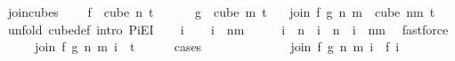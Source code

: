 \begin{isabellebody}
\isanewline
{}\isamarkupfalse%
\ join{\isacharunderscore}{\kern0pt}cubes{\isacharcolon}{\kern0pt}\ \isanewline
\ \ \ {\isachardoublequoteopen}f\ {\isasymin}\ cube\ n\ {\isacharparenleft}{\kern0pt}t{\isacharplus}{\kern0pt}{}{\isacharparenright}{\kern0pt}{\isachardoublequoteclose}\ \isanewline
\ \ \ \ \ {\isachardoublequoteopen}g\ {\isasymin}\ cube\ m\ {\isacharparenleft}{\kern0pt}t{\isacharplus}{\kern0pt}{}{\isacharparenright}{\kern0pt}{\isachardoublequoteclose}\isanewline
\ \ \ {\isachardoublequoteopen}join\ f\ g\ n\ m\ {\isasymin}\ cube\ {\isacharparenleft}{\kern0pt}n{\isacharplus}{\kern0pt}m{\isacharparenright}{\kern0pt}\ {\isacharparenleft}{\kern0pt}t{\isacharplus}{\kern0pt}{}{\isacharparenright}{\kern0pt}{\isachardoublequoteclose}\isanewline
%
\isadelimproof
%
\endisadelimproof
%
\isatagproof
{}\isamarkupfalse%
\ {\isacharparenleft}{\kern0pt}unfold\ cube{\isacharunderscore}{\kern0pt}def{\isacharsemicolon}{\kern0pt}\ intro\ PiE{\isacharunderscore}{\kern0pt}I{\isacharparenright}{\kern0pt}\isanewline
\ \ \isamarkupfalse%
\ i\isanewline
\ \ \isamarkupfalse%
\ {\isachardoublequoteopen}i\ {\isasymin}\ {\isacharbraceleft}{\kern0pt}{\isachardot}{\kern0pt}{\isachardot}{\kern0pt}{\isacharless}{\kern0pt}n{\isacharplus}{\kern0pt}m{\isacharbraceright}{\kern0pt}{\isachardoublequoteclose}\isanewline
\ \ \isamarkupfalse%
\ \isamarkupfalse%
\ {\isachardoublequoteopen}i\ {\isacharless}{\kern0pt}\ n{\isachardoublequoteclose}\ {\isacharbar}{\kern0pt}\ {\isachardoublequoteopen}i\ {\isasymge}\ n\ {\isasymand}\ i\ {\isacharless}{\kern0pt}\ n{\isacharplus}{\kern0pt}m{\isachardoublequoteclose}\ \isamarkupfalse%
\ fastforce\isanewline
\ \ \isamarkupfalse%
\ \isamarkupfalse%
\ {\isachardoublequoteopen}join\ f\ g\ n\ m\ i\ {\isasymin}\ {\isacharbraceleft}{\kern0pt}{\isachardot}{\kern0pt}{\isachardot}{\kern0pt}{\isacharless}{\kern0pt}t\ {\isacharplus}{\kern0pt}\ {}{\isacharbraceright}{\kern0pt}{\isachardoublequoteclose}\isanewline
\ \ \isamarkupfalse%
\ {\isacharparenleft}{\kern0pt}cases{\isacharparenright}{\kern0pt}\isanewline
\ \ \ \ \isamarkupfalse%
\ {}\isanewline
\ \ \ \ \isamarkupfalse%
\ \isamarkupfalse%
\ {\isachardoublequoteopen}join\ f\ g\ n\ m\ i\ {\isacharequal}{\kern0pt}\ f\ i{\isachardoublequoteclose}\ \isamarkupfalse%

\end{isabellebody}
